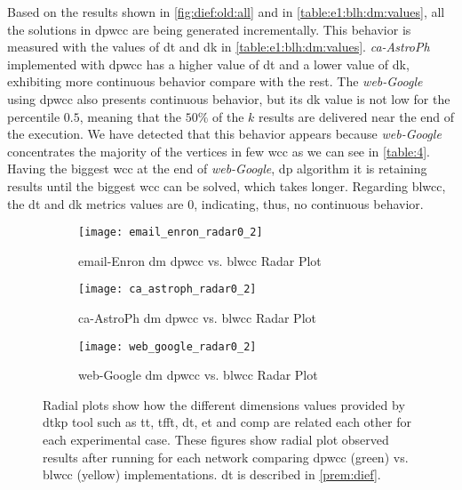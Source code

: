 Based on the results shown in \autoref{fig:dief:old:all} and in \autoref{table:e1:blh:dm:values}, all the solutions in \acrshort{dpwcc} are being generated incrementally. This behavior is measured with the values of \acrshort{dt} and \acrshort{dk} in \autoref{table:e1:blh:dm:values}. \emph{ca-AstroPh} implemented with \acrshort{dpwcc} has a higher value of \acrshort{dt} and a lower value of \acrshort{dk}, exhibiting more continuous behavior compare with the rest.
The \emph{web-Google} using \acrshort{dpwcc} also presents continuous behavior, but its \acrshort{dk} value is not low for the percentile $0.5$, meaning that the $50\%$ of the $k$ results are delivered near the end of the execution. We have detected that this behavior appears because \emph{web-Google} concentrates the majority of the vertices in few \acrshort{wcc} as we can see in \autoref{table:4}. Having the biggest \acrshort{wcc} at the end of \emph{web-Google}, \acrshort{dp} algorithm it is retaining results until the biggest \acrshort{wcc} can be solved, which takes longer. Regarding \acrshort{blwcc}, the \acrshort{dt} and \acrshort{dk} metrics values are $0$, indicating, thus, no continuous behavior.


\begin{figure}[htp!]
  \centering
  \begin{subfigure}[t]{0.3\textwidth}
   \texttt{[image: email\_enron\_radar0\_2]}
   \caption{email-Enron \acrlong{dm} \acrshort{dpwcc} vs. \acrshort{blwcc} Radar Plot}
   \label{fig:dief:rad:1}
  \end{subfigure}\hfill
  \begin{subfigure}[t]{0.3\textwidth}
   \texttt{[image: ca\_astroph\_radar0\_2]}
   \caption{ca-AstroPh \acrlong{dm} \acrshort{dpwcc} vs. \acrshort{blwcc} Radar Plot}
   \label{fig:dief:rad:2}
  \end{subfigure}\hfill
  \begin{subfigure}[t]{0.3\textwidth}
   \texttt{[image: web\_google\_radar0\_2]}
   \caption{web-Google \acrlong{dm} \acrshort{dpwcc} vs. \acrshort{blwcc} Radar Plot}
   \label{fig:dief:rad:3}
  \end{subfigure}\hfill
   \caption{Radial plots show how the different dimensions values provided by \acrshort{dtkp} tool such as \acrshort{tt}, \acrshort{tfft}, \acrshort{dt}, \acrshort{et} and \acrshort{comp} are related each other for each experimental case. These figures show radial plot observed results after running for each network comparing \acrshort{dpwcc} (green) vs. \acrshort{blwcc} (yellow) implementations.  \acrshort{dt} is described in \autoref{prem:dief}.}
   \label{fig:dief:radial:old:all}
 \end{figure}

